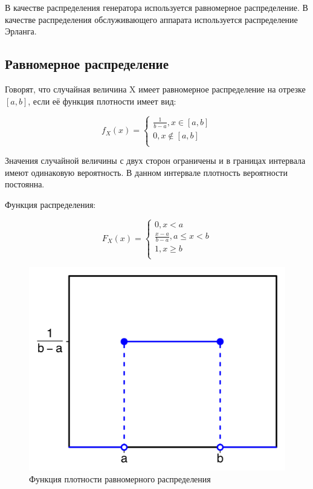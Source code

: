 В качестве распределения генератора используется равномерное распределение. В качестве распределения обслуживающего аппарата используется распределение Эрланга.

\subsection{Равномерное распределение}
    
Говорят, что случайная величина X имеет равномерное распределение на отрезке $[a,b]$, если её функция плотности имеет вид:

\begin{equation*}
    f_X (x) =
    \begin{cases}
        \frac{1}{b-a}, x \in [a,b] \\
        0, x \notin [a, b] \\
    \end{cases}
\end{equation*}

Значения случайной величины с двух сторон ограничены и в границах интервала имеют одинаковую вероятность. В данном интервале плотность вероятности постоянна.

Функция распределения:

\begin{equation*}
F_X (x) =
    \begin{cases}
        0, x < a \\
        \frac{x - a}{b - a}, a \le x < b \\
        1, x \geq b \\
    \end{cases}
\end{equation*}

\begin{figure}[H]
    \begin{center}
    \includegraphics[width=0.5\linewidth]{assets/uni_f.png}
    \caption{Функция плотности равномерного распределения}
    \label{fig:}
    \end{center}
\end{figure}

